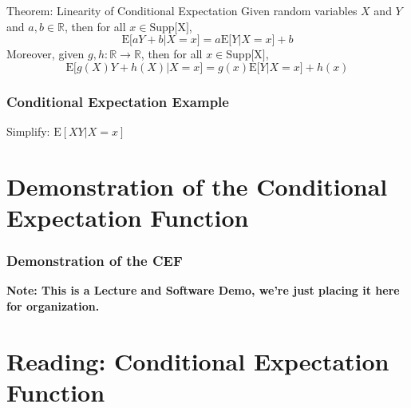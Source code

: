 \documentclass[12pt, block=fill]{beamer}
\newcommand{\E}{\text{E}}
\newcommand{\R}{\mathbb{R}}
\begin{document}
\begin{frame}
  
  \begin{block}{Theorem: Linearity of Conditional Expectation}
  Given random variables $X$ and $Y$ and $a,b \in \R$, then for all $x \in \text{Supp[X]}$,
    $$\E \big[ aY + b \big| X=x  \big]  = a\E\big[ Y \big| X=x \big] + b$$
Moreover, given $g,h:\R \rightarrow \R$, then for all $x \in \text{Supp[X]}$,
  $$\E \big[ g(X)Y + h(X) \big| X=x  \big]  = g(x)\E\big[ Y \big| X=x \big] + h(x)$$
  \end{block}
\end{frame}



\begin{frame}
  \frametitle{Conditional Expectation Example}
  Simplify: $\E[ XY | X=x]$
\end{frame}



 
 \section{Demonstration of the Conditional Expectation Function}
 
 \begin{frame}
   \frametitle{Demonstration of the CEF}
   \textbf{Note: This is a Lecture and Software Demo, we're just
     placing it here for organization.}    
 \end{frame}
 
  \section{Reading: Conditional Expectation Function}
\end{document}
